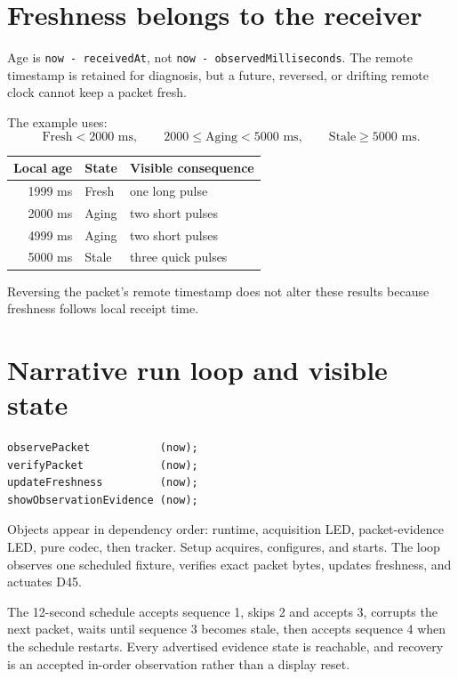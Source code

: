 \documentclass[11pt]{article}
\begin{document}
\section{Freshness belongs to the receiver}

Age is \texttt{now - receivedAt}, not \texttt{now -
observedMilliseconds}. The remote timestamp is retained for diagnosis, but a
future, reversed, or drifting remote clock cannot keep a packet fresh.

The example uses:
\[
\text{Fresh}<2000\text{ ms},\qquad
2000\leq\text{Aging}<5000\text{ ms},\qquad
\text{Stale}\geq5000\text{ ms}.
\]

\begin{tabularx}{\linewidth}{@{}r l X@{}}
\toprule
Local age & State & Visible consequence\\
\midrule
1999 ms & Fresh & one long pulse\\
2000 ms & Aging & two short pulses\\
4999 ms & Aging & two short pulses\\
5000 ms & Stale & three quick pulses\\
\bottomrule
\end{tabularx}

Reversing the packet's remote timestamp does not alter these results because
freshness follows local receipt time.

\section{Narrative run loop and visible state}

\begin{lstlisting}[style=adkcpp]
observePacket           (now);
verifyPacket            (now);
updateFreshness         (now);
showObservationEvidence (now);
\end{lstlisting}

Objects appear in dependency order: runtime, acquisition LED, packet-evidence
LED, pure codec, then tracker. Setup acquires, configures, and starts. The loop
observes one scheduled fixture, verifies exact packet bytes, updates freshness,
and actuates D45.

The 12-second schedule accepts sequence 1, skips 2 and accepts 3, corrupts the
next packet, waits until sequence 3 becomes stale, then accepts sequence 4
when the schedule restarts. Every advertised evidence state is reachable, and
recovery is an accepted in-order observation rather than a display reset.
\end{document}
